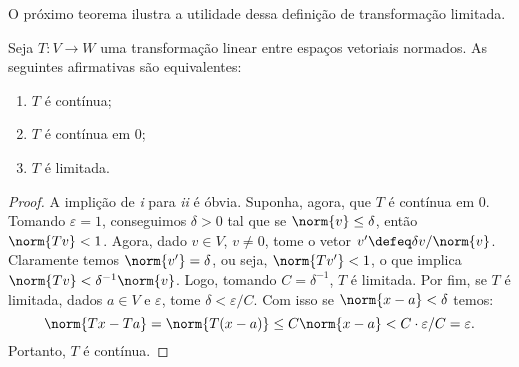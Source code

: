 O próximo teorema ilustra a utilidade dessa definição de transformação limitada.

\begin{teo}
    Seja \( T : V \to W \) uma transformação linear entre espaços vetoriais normados.
    As seguintes afirmativas são equivalentes:
    \begin{enumerate}[label=\roman*)]
        \item \( T \) é contínua;
        \item \( T \) é contínua em \( 0 \);
        \item \( T \) é limitada.
    \end{enumerate}
\end{teo}
\begin{proof}
    A implição de \emph{i} para \emph{ii} é óbvia.
    Suponha, agora, que \( T \) é contínua em \( 0 \).
    Tomando \( \varepsilon = 1 \), conseguimos \( \delta > 0 \) tal que se \( \norm{ v } \leq \delta \), então \( \norm{ Tv } < 1 \).
    Agora, dado \( v \in V \), \( v \neq 0 \), tome o vetor \( v' \defeq \delta v / \norm{ v } \).
    Claramente temos \( \norm{ v' } = \delta \), ou seja, \( \norm{ Tv' } < 1 \), o que implica \( \norm{ Tv } < \delta^{ -1 } \norm{ v } \).
    Logo, tomando \( C = \delta^{ -1 } \), \( T \) é limitada.
    Por fim, se \( T \) é limitada, dados \( a \in V \) e \( \varepsilon \), tome \( \delta < \varepsilon/C \).
    Com isso se \( \norm{ x - a } < \delta \) temos:
    \begin{equation}
        \norm{ Tx - Ta } = \norm{ T(x - a) } \leq C \norm{ x - a } < C \cdot \varepsilon/C = \varepsilon
    .\end{equation}
    Portanto, \( T \) é contínua.
\end{proof}

